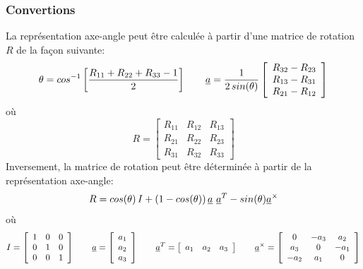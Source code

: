 \subsubsection{Convertions}
La représentation axe-angle peut être calculée à partir d'une matrice de rotation $R$ de la façon suivante:
\begin{equation} 
\theta=cos^{-1}\left[\frac{R_{11}+R_{22}+R_{33}-1}{2}\right]
\quad\quad 
\underline{a}=\frac{1}{2 \, sin(\theta)}\left[ \begin{array}{c}
R_{32}-R_{23}  \\ 
R_{13}-R_{31} \\ 
R_{21}-R_{12} \end{array}
\right]
\end{equation}
où
\begin{equation}
R =\left[ \begin{array}{ccc}
R_{11} & R_{12} & R_{13} \\ 
R_{21} & R_{22} & R_{23} \\ 
R_{31} & R_{32} & R_{33} \end{array}
\right]
\end{equation}
Inversement, la matrice de rotation peut être déterminée à partir de la représentation axe-angle:
\begin{equation}
R=cos(\theta) \, I + (1-cos(\theta) ) \, \underline{a}\ \underline{a}^T-sin(\theta)\underline{a}^{\times}
\end{equation}
où
\begin{equation}
I =\left[ \begin{array}{ccc}
1 & 0 & 0 \\ 
0 & 1 & 0 \\ 
0 & 0 & 1      \end{array}
\right] \quad\quad
\underline{a}=\left[ \begin{array}{c}
a_{1}  \\ 
a_{2}  \\ 
a_{3} \end{array}
\right]
\quad\quad
\underline{a}^T=\left[ \begin{array}{ccc} a_{1} & a_{2} & a_{3} \end{array} \right]
\quad\quad
\underline{a}^{\times} =\left[ \begin{array}{ccc}
0      & -a_{3} &  a_{2} \\ 
 a_{3} & 0      & -a_{1} \\ 
-a_{2} &  a_{1} & 0      \end{array}
\right]
\end{equation}


